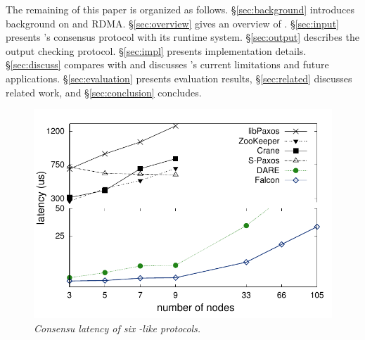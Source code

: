 

The remaining of this paper is organized as follows.
\S\ref{sec:background} introduces background on \paxos and RDMA.
\S\ref{sec:overview} gives an overview of \xxx. \S\ref{sec:input} presents 
\xxx's consensus protocol with its runtime system. \S\ref{sec:output} describes 
the output checking protocol.  \S\ref{sec:impl} presents implementation 
details. \S\ref{sec:discuss} compares \dare with \xxx and discusses \xxx's 
current limitations and future applications. \S\ref{sec:evaluation} presents 
evaluation results, \S\ref{sec:related} discusses related work, and 
\S\ref{sec:conclusion} concludes.

\begin{figure}[t]
\centering
\vspace{-.10in}
\includegraphics[width=.45\textwidth]{figures/traditional_paxos_latency}
\vspace{-.15in}
\caption{{\em Consensu latency of six \paxos-like protocols.}}
\label{fig:scalability}
\vspace{-.20in}
\end{figure}
